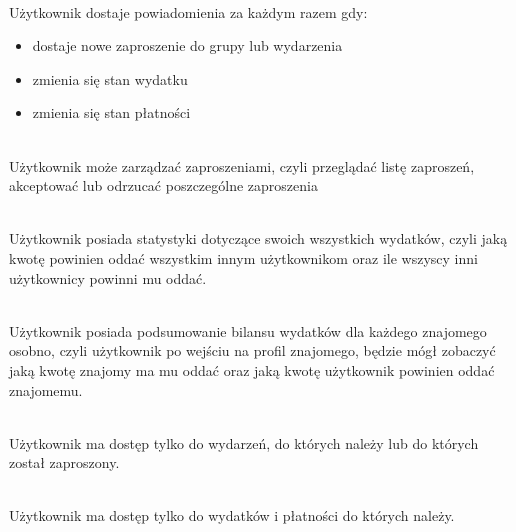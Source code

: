 \begin{description}[leftmargin={15pt},labelindent={0pt}]
  \item[WF8.] \hfill \\ Użytkownik dostaje powiadomienia za każdym razem gdy:
    \begin{itemize}
      \item dostaje nowe zaproszenie do grupy lub wydarzenia
      \item zmienia się stan wydatku
      \item zmienia się stan płatności
    \end{itemize}
  \item[WF9.] \hfill \\ Użytkownik może zarządzać zaproszeniami, czyli przeglądać listę zaproszeń, akceptować lub odrzucać poszczególne zaproszenia
  \item[WF10.] \hfill \\ Użytkownik posiada statystyki dotyczące swoich wszystkich wydatków, czyli jaką kwotę powinien oddać wszystkim innym użytkownikom oraz ile wszyscy inni użytkownicy powinni mu oddać.
  \item[WF11.] \hfill \\ Użytkownik posiada podsumowanie bilansu wydatków dla każdego znajomego osobno, czyli użytkownik po wejściu na profil znajomego, będzie mógł zobaczyć jaką kwotę znajomy ma mu oddać oraz jaką kwotę użytkownik powinien oddać znajomemu.
  \item[WF12.] \hfill \\ Użytkownik ma dostęp tylko do wydarzeń, do których należy lub do których został zaproszony.
  \item[WF13.] \hfill \\ Użytkownik ma dostęp tylko do wydatków i płatności do których należy.
\end{description}


